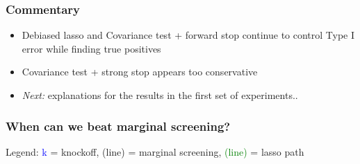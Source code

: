 \documentclass{beamer}
\begin{document}
\begin{frame}
\frametitle{Commentary}
\begin{itemize}
\item Debiased lasso and Covariance test + forward stop continue to control Type I error while finding true positives
\item Covariance test + strong stop appears too conservative
\item \emph{Next:} explanations for the results in the first set of experiments..
\end{itemize}
\end{frame}


\begin{frame}
\frametitle{When can we beat marginal screening?}
Legend: \textcolor{blue}{k} = knockoff, (line) = marginal screening, \textcolor{green}{(line)} = lasso path


\end{frame}
\end{document}
